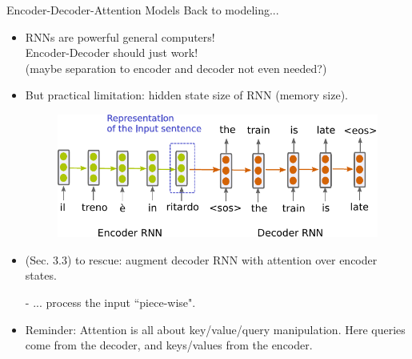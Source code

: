 \begin{frame}{Encoder-Decoder-Attention Models}
Back to modeling...
\begin{itemize}
\item RNNs are powerful general computers!\\ Encoder-Decoder should just work! \\(maybe separation to encoder and decoder not even needed?)
\item But practical limitation: hidden state size of RNN (memory size).
\begin{figure}
  \begin{center}
    \includegraphics[height=0.3\textheight]{figures/enc-dec.pdf}
  \end{center}
\end{figure}
\pause
\item {} (Sec. 3.3) to rescue: augment decoder RNN with attention over encoder states.
\pause
\item[-] ... process the input ``piece-wise".
\item Reminder: Attention is all about key/value/query manipulation. Here queries come from the decoder,
and keys/values from the encoder.
\end{itemize}
\end{frame}

